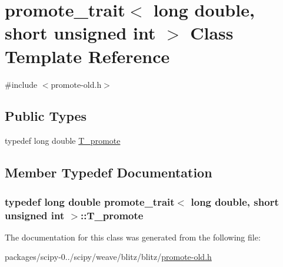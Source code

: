 \hypertarget{classpromote__trait_3_01long_01double_00_01short_01unsigned_01int_01_4}{}\section{promote\+\_\+trait$<$ long double, short unsigned int $>$ Class Template Reference}
\label{classpromote__trait_3_01long_01double_00_01short_01unsigned_01int_01_4}


{\ttfamily \#include $<$promote-\/old.\+h$>$}

\subsection*{Public Types}
\begin{DoxyCompactItemize}
\item 
typedef long double \hyperlink{classpromote__trait_3_01long_01double_00_01short_01unsigned_01int_01_4_ac8973b2f8f6824fa7c9ac00e84af3629}{T\+\_\+promote}
\end{DoxyCompactItemize}


\subsection{Member Typedef Documentation}
\hypertarget{classpromote__trait_3_01long_01double_00_01short_01unsigned_01int_01_4_ac8973b2f8f6824fa7c9ac00e84af3629}{}
\subsubsection[{T\+\_\+promote}]{\setlength{\rightskip}{0pt plus 5cm}typedef long double {\bf promote\+\_\+trait}$<$ long double, short unsigned int $>$\+::{\bf T\+\_\+promote}}\label{classpromote__trait_3_01long_01double_00_01short_01unsigned_01int_01_4_ac8973b2f8f6824fa7c9ac00e84af3629}


The documentation for this class was generated from the following file\+:\begin{DoxyCompactItemize}
\item 
packages/scipy-\/0../scipy/weave/blitz/blitz/\hyperlink{promote-old_8h}{promote-\/old.\+h}\end{DoxyCompactItemize}
